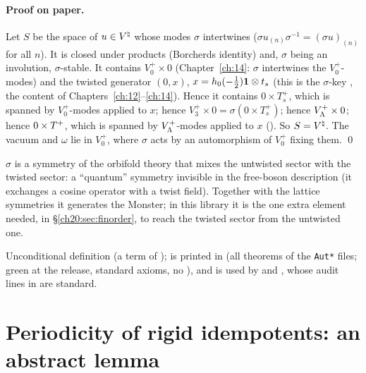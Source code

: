 \paragraph{Proof on paper.}  Let $S$ be the space of $u\in{V^{\natural}}$ whose modes $\sigma$ intertwines
($\sigma u_{(n)}\sigma^{-1}=(\sigma u)_{(n)}$ for all $n$).  It is closed under products (Borcherds identity) and, $\sigma$
being an involution, $\sigma$-stable.  It contains $V_0^+\times0$ (Chapter~\ref{ch:14}: $\sigma$ intertwines the
$V_0^+$-modes) and the twisted generator $(0,x)$, $x=h_0(-\tfrac12)\mathbf 1\otimes t_s$ (this is the $\sigma$-key
, the content of Chapters~\ref{ch:12}--\ref{ch:14}).  Hence it contains $0\times T_s^+$, which is
spanned by $V_0^+$-modes applied to $x$; hence $V_3^+\times0=\sigma(0\times T_s^+)$; hence $V_{\Lambda}^{+}\times0$; hence
$0\times T^{+}$, which is spanned by $V_{\Lambda}^{+}$-modes applied to $x$ ().  So $S={V^{\natural}}$.  The
vacuum and $\omega$ lie in $V_0^+$, where $\sigma$ acts by an automorphism of $V_0^+$ fixing them. \qed
\begin{physics}
$\sigma$ is a symmetry of the orbifold theory that mixes the untwisted sector with the twisted sector: a ``quantum''
symmetry invisible in the free-boson description (it exchanges a cosine operator with a twist field).  Together with
the lattice symmetries it generates the Monster; in this library it is the one extra element needed, in
\S\ref{ch20:sec:finorder}, to reach the twisted sector from the untwisted one.
\end{physics}
\begin{status}
Unconditional definition (a term of );  is printed in  (all theorems of the \texttt{Aut*} files; green at the release, standard axioms, no ), and
 is used by  and , whose audit lines in
 are standard.
\end{status}

\section{Periodicity of rigid idempotents: an abstract lemma}\label{ch20:sec:periodic}

